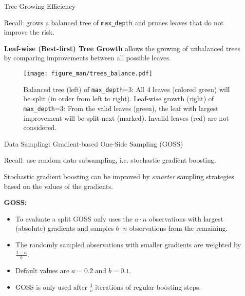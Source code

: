 \begin{vbframe}{Tree Growing Efficiency}

Recall:  grows a balanced tree of \texttt{max\_depth} and prunes leaves that do not improve the risk.

\lz

\textbf{Leaf-wise (Best-first) Tree Growth} allows the growing of unbalanced trees by comparing improvements between all possible leaves.

\lz

\begin{figure}
\texttt{[image: figure\_man/trees\_balance.pdf]}
\caption*{\scriptsize Balanced tree (left) of \texttt{max\_depth}=3: All 4 leaves (colored green) will be split (in order from left to right).
Leaf-wise growth (right) of \texttt{max\_depth}=3: From the valid leaves (green), the leaf with largest improvement will be split next (marked). Invalid leaves (red) are not considered.}
\end{figure}

\end{vbframe}

\begin{vbframe}{Data Sampling: Gradient-based One-Side Sampling (GOSS)}

Recall:  use random data subsampling, i.e. stochastic gradient boosting.

\lz

Stochastic gradient boosting can be improved by \emph{smarter} sampling strategies based on the values of the gradients.

\lz

\textbf{GOSS:}
\begin{itemize}
  \item To evaluate a split GOSS only uses the $a\cdot n$ observations with largest (absolute) gradients and samples $b\cdot n$ observations from the remaining.
  \item The randomly sampled observations with smaller gradients are weighted by $\frac{1 - a}{b}$.
  \item Default values are $a=0.2$ and $b=0.1$.
  \item GOSS is only used after $\frac{1}{\nu}$ iterations of regular boosting steps.
\end{itemize}


\end{vbframe}

